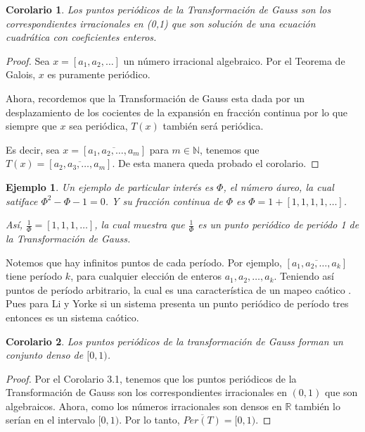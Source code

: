 \documentclass[12pt]{report}
\newtheorem{ejem}{Ejemplo}[section]
\newtheorem{cor}{Corolario}[section]
\begin{document}
\begin{cor}
Los puntos periódicos de la Transformación de Gauss son los correspondientes irracionales en (0,1) que son solución de una ecuación cuadrática con coeficientes enteros.
\end{cor}
\begin{proof}
Sea $x=[a_{1},a_{2},\ldots]$ un número irracional algebraico. Por el Teorema de Galois, $x$ es puramente periódico.

Ahora, recordemos que la Transformación de Gauss esta dada por un desplazamiento de los cocientes de la expansión en fracción continua por lo que siempre que $x$ sea periódica, $T(x)$ también será periódica.

Es decir, sea $x=[\overline{a_{1},a_{2},\ldots,a_{m}}]$ para $m\in\mathbb{N}$, tenemos que $T(x)=[\overline{a_{2},a_{3},\ldots,a_{m}}]$.
De esta manera queda probado el corolario.
\end{proof}

\begin{ejem}
Un ejemplo de particular interés es $\Phi$, el número áureo, la cual satiface $\Phi^{2}-\Phi-1=0$. Y su fracción continua de $\Phi$ es $\Phi=1+[1,1,1,1,\ldots]$.

Así, $\frac{1}{\Phi}=[1,1,1,\ldots]$, la cual muestra que $\frac{1}{\Phi}$ es un punto periódico de periódo 1 de la Transformación de Gauss.
\end{ejem}

Notemos que hay infinitos puntos de cada período. Por ejemplo, $[\overline{a_{1},a_{2},\ldots,a_{k}}]$ tiene período $k$, para cualquier elección de enteros $a_{1},a_{2},\ldots,a_{k}$. Teniendo así puntos de período arbitrario, la cual es una característica de un mapeo caótico \cite{TYJY1975}. Pues para Li y Yorke si un sistema presenta un punto periódico de período tres entonces es un sistema caótico.


\begin{cor}
Los puntos periódicos de la transformación de Gauss forman un conjunto denso de $[0,1)$.
\end{cor}
\begin{proof}
Por el Corolario 3.1, tenemos que los puntos periódicos de la Transformación de Gauss son los correspondientes irracionales en $(0,1)$ que son algebraicos. Ahora, como los números irracionales son densos en $\mathbb{R}$ también lo serían en el intervalo $[0,1)$. Por lo tanto, $\overline{Per(T)}=[0,1)$.
\end{proof}
\end{document}
